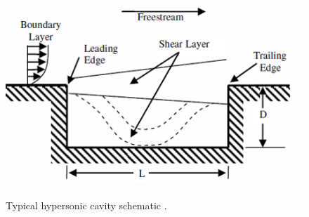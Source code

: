 
\begin{figure}
\centering
\includegraphics[height=3in]{Figures/CavityDiagram.png}
\caption[Diagram of typical cavity]{Typical hypersonic cavity schematic \cite{lazar2008control}.}
\end{figure}
